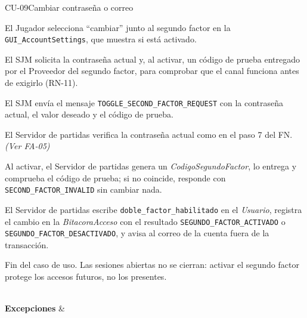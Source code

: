 \begin{fichacu}{CU-09}{Cambiar contraseña o correo}
{\begin{cuenum}[start=1]
      \item El Jugador selecciona ``cambiar'' junto al segundo factor en la \texttt{GUI\_\allowbreak{}AccountSettings}, que muestra si está activado.
      \item El SJM solicita la contraseña actual y, al activar, un código de prueba entregado por el Proveedor del segundo factor, para comprobar que el canal funciona antes de exigirlo (\mbox{RN-11}).
      \item El SJM envía el mensaje \texttt{TOGGLE\_\allowbreak{}SECOND\_\allowbreak{}FACTOR\_\allowbreak{}REQUEST} con la contraseña actual, el valor deseado y el código de prueba.
      \item El Servidor de partidas verifica la contraseña actual como en el paso 7 del FN. \textit{(Ver \mbox{FA-05})}
      \item Al activar, el Servidor de partidas genera un \textit{CodigoSegundoFactor}, lo entrega y comprueba el código de prueba; si no coincide, responde con \texttt{SECOND\_\allowbreak{}FACTOR\_\allowbreak{}INVALID} sin cambiar nada.
      \item El Servidor de partidas escribe \texttt{doble\_\allowbreak{}factor\_\allowbreak{}habilitado} en el \textit{Usuario}, registra el cambio en la \textit{BitacoraAcceso} con el resultado \texttt{SEGUNDO\_\allowbreak{}FACTOR\_\allowbreak{}ACTIVADO} o \texttt{SEGUNDO\_\allowbreak{}FACTOR\_\allowbreak{}DESACTIVADO}, y avisa al correo de la cuenta fuera de la transacción.
      \item Fin del caso de uso. Las sesiones abiertas no se cierran: activar el segundo factor protege los accesos futuros, no los presentes.
    \end{cuenum}} \\ \hline
  \textbf{Excepciones} & 
\end{fichacu}
